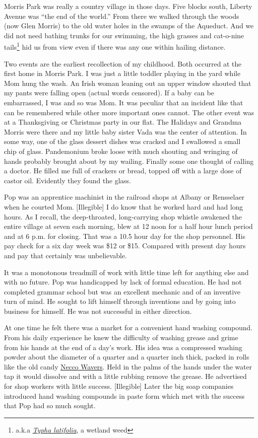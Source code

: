 \documentclass[12pt]{book}              %
\begin{document}
Morris Park was really a country village in those days. Five blocks south, Liberty Avenue was ``the end of the world.'' From there we walked through the woods (now Glen Morris) to the old water holes in the swamps of the Aqueduct. And we did not need bathing trunks for our swimming, the high grasses and cat-o-nine tails\footnote{a.k.a \href{http://en.wikipedia.org/wiki/Typha_latifolia}{\it Typha latifolia}, a wetland weed} hid us from view even if there was any one within hailing distance. 

Two events are the earliest recollection of my childhood. Both occurred at the first home in Morris Park. I was just a little toddler playing in the yard while Mom hung the wash. An Irish woman leaning out an upper window shouted that my pants were falling open (actual words censored). If a baby can be embarrassed, I was and so was Mom. It was peculiar that an incident like that can be remembered while other more important ones cannot. The other event was at a Thanksgiving or Christmas party in our flat. The Halidays and Grandma Morris were there and my little baby sister Vada was the center of attention. In some way, one of the glass dessert dishes was cracked and I swallowed a small chip of glass. Pandemonium broke loose with much shouting and wringing of hands probably brought about by my wailing. Finally some one thought of calling a doctor. He filled me full of crackers or bread, topped off with a large dose of castor oil. Evidently they found the glass. 

Pop was an apprentice machinist in the railroad shops at Albany or Rensselaer when he courted Mom. [Illegible] I do know that he worked hard and had long hours. As I recall, the deep-throated, long-carrying shop whistle awakened the entire village at seven each morning, blew at 12 noon for a half hour lunch period and at 6 p.m. for closing. That was a 10.5 hour day for the shop personnel. His pay check for a six day week was \$12 or \$15. Compared with present day hours and pay that certainly was unbelievable. 

It was a monotonous treadmill of work with little time left for anything else and with no future. Pop was handicapped by lack of formal education. He had not completed grammar school but was an excellent mechanic and of an inventive turn of mind. He sought to lift himself through inventions and by going into business for himself. He was not successful in either direction. 

At one time he felt there was a market for a convenient hand washing compound. From his daily experience he knew the difficulty of washing grease and grime from his hands at the end of a day's work. His idea was a compressed washing powder about the diameter of a quarter and a quarter inch thick, packed in rolls like the old candy \href{http://en.wikipedia.org/wiki/Necco_Wafers}{Necco Wavers}. Held in the palms of the hands under the water tap it would dissolve and with a little rubbing remove the grease. He advertised for shop workers with little success. [Illegible] Later the big soap companies introduced hand washing compounds in paste form which met with the success that Pop had so much sought. 
\end{document}
